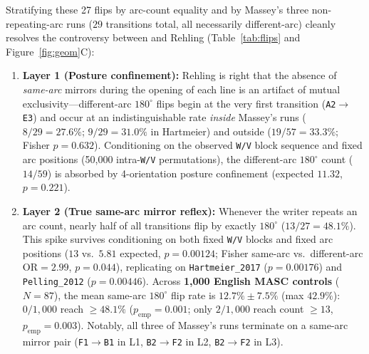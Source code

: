 \documentclass[10pt,a4paper,twocolumn]{article}
\newcommand{\code}[1]{\texttt{\small #1}}
\begin{document}
Stratifying these 27 flips by arc-count equality and by Massey's three non-repeating-arc runs ($29$ transitions total, all necessarily different-arc) cleanly resolves the controversy between \citet{massey2017dorabella} and Rehling \citep{pelling2019dorabella} (Table~\ref{tab:flips} and Figure~\ref{fig:geom}C):
\begin{enumerate}
  \item \textbf{Layer 1 (Posture confinement):} Rehling is right that the absence of \emph{same-arc} mirrors during the opening of each line is an artifact of mutual exclusivity---different-arc $180^\circ$ flips begin at the very first transition (\code{A2$\to$E3}) and occur at an indistinguishable rate \emph{inside} Massey's runs ($8/29 = 27.6\%$; $9/29 = 31.0\%$ in Hartmeier) and outside ($19/57 = 33.3\%$; Fisher $p = 0.632$). Conditioning on the observed \code{W/V} block sequence and fixed arc positions (50,000 intra-\code{W/V} permutations), the different-arc $180^\circ$ count ($14/59$) is absorbed by 4-orientation posture confinement (expected $11.32$, $p = 0.221$).
  \item \textbf{Layer 2 (True same-arc mirror reflex):} Whenever the writer repeats an arc count, nearly half of all transitions flip by exactly $180^\circ$ ($13/27 = 48.1\%$). This spike survives conditioning on both fixed \code{W/V} blocks and fixed arc positions ($13$ vs.\ $5.81$ expected, \textbf{$p = 0.00124$}; Fisher same-arc vs.\ different-arc $\mathrm{OR} = 2.99$, $p = 0.044$), replicating on \code{Hartmeier\_2017} ($p = 0.00176$) and \code{Pelling\_2012} ($p = 0.00446$). Across \textbf{1,000 English MASC controls} ($N=87$), the mean same-arc $180^\circ$ flip rate is $12.7\% \pm 7.5\%$ (max $42.9\%$): \textbf{$0/1{,}000$} reach $\ge 48.1\%$ ($p_{\mathrm{emp}} = 0.001$; only $2/1{,}000$ reach count $\ge 13$, $p_{\mathrm{emp}} = 0.003$). Notably, all three of Massey's runs terminate on a same-arc mirror pair (\code{F1$\to$B1} in L1, \code{B2$\to$F2} in L2, \code{B2$\to$F2} in L3).
\end{enumerate}
\end{document}
